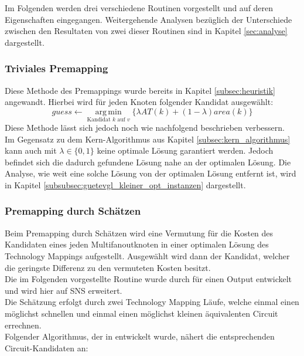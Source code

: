 \documentclass[11pt, a4paper, german]{article}
\newcommand{\TM}{Technology  Mapping }
\DeclareMathOperator*{\argmin}{arg\,min}
\begin{document}
Im Folgenden werden drei verschiedene Routinen vorgestellt und auf deren Eigenschaften eingegangen. Weitergehende Analysen bezüglich der Unterschiede zwischen den Resultaten von zwei dieser Routinen sind in Kapitel \ref{sec:analyse} dargestellt.

\subsubsection{Triviales Premapping}
\label{subsec:triviales_premapping}
Diese Methode des Premappings wurde bereits in Kapitel \ref{subsec:heuristik} angewandt. Hierbei wird für jeden Knoten folgender Kandidat ausgewählt: \[ guess \gets \argmin\limits_{\text{Kandidat }k\text{ auf }v}\{ \lambda AT(k) + (1-\lambda) area(k)  \} \]
Diese Methode lässt sich jedoch noch wie nachfolgend beschrieben verbessern.\\

Im Gegensatz zu dem Kern-Algorithmus aus Kapitel \ref{subsec:kern_algorithmus} kann auch mit $\lambda \in \{ 0 , 1\}$ keine optimale Lösung garantiert werden. Jedoch befindet sich die dadurch gefundene Lösung nahe an der optimalen Lösung. Die Analyse, wie weit eine solche Lösung von der optimalen Lösung entfernt ist, wird in Kapitel \ref{subsubsec:guetevgl_kleiner_opt_instanzen} dargestellt.
 
\subsubsection{Premapping durch Schätzen}
\label{subsec:premapping_duch_schaetzen}
Beim Premapping durch Schätzen wird eine Vermutung für die Kosten des Kandidaten eines jeden Multifanoutknoten in einer optimalen Lösung des Technology Mappings aufgestellt. Ausgewählt wird dann der Kandidat, welcher die geringste Differenz zu den vermuteten Kosten besitzt.\\
Die im Folgenden vorgestellte Routine wurde durch \cite{Elbert} für einen Output entwickelt und wird hier auf SNS erweitert.\\
Die Schätzung erfolgt durch zwei \TM Läufe, welche einmal einen möglichst schnellen und einmal einen möglichst kleinen äquivalenten Circuit errechnen.\\

Folgender Algorithmus, der in \cite{Elbert} entwickelt wurde, nähert die entsprechenden Circuit-Kandidaten an:\\
\end{document}
